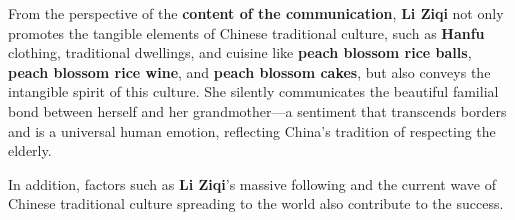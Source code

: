 From the perspective of the \textbf{content of the communication}, \textbf{Li Ziqi} not only promotes the tangible elements of Chinese traditional culture, such as \textbf{Hanfu} clothing, traditional dwellings, and cuisine like \textbf{peach blossom rice balls}, \textbf{peach blossom rice wine}, and \textbf{peach blossom cakes}, but also conveys the intangible spirit of this culture. She silently communicates the beautiful familial bond between herself and her grandmother—a sentiment that transcends borders and is a universal human emotion, reflecting China's tradition of respecting the elderly.

In addition, factors such as \textbf{Li Ziqi}'s massive following and the current wave of Chinese traditional culture spreading to the world also contribute to the success.
